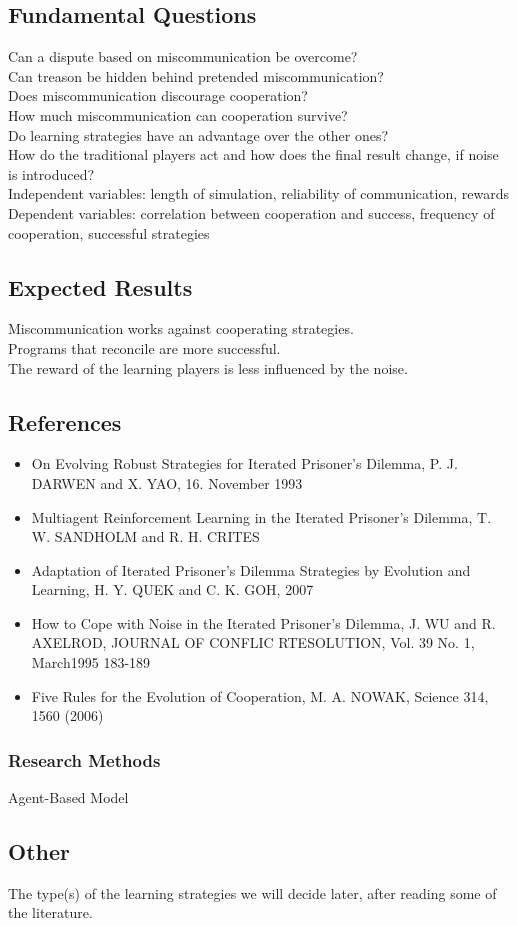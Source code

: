 \documentclass[11pt,twoside]{article}
\begin{document}
\subsection{Fundamental Questions}
Can a dispute based on miscommunication be overcome?\\
Can treason be hidden behind pretended miscommunication?\\
Does miscommunication discourage cooperation?\\
How much miscommunication can cooperation survive?\\
Do learning strategies have an advantage over the other ones?\\
How do the traditional players act and how does the final result change, 
if noise is introduced?\\
Independent variables: length of simulation, reliability of communication, rewards\\
Dependent variables: correlation between cooperation and success, frequency of cooperation, successful strategies

\subsection{Expected Results}
Miscommunication works against cooperating strategies.\\ 
Programs that reconcile are more successful.\\
The reward of the learning players is less influenced by the noise.

\subsection{References}

\begin{itemize}
\item On Evolving Robust Strategies for Iterated Prisoner's Dilemma, P. J. DARWEN and X. YAO, 16. November 1993\\
\item Multiagent Reinforcement Learning in the Iterated Prisoner's Dilemma, T. W. SANDHOLM and R. H. CRITES\\
\item Adaptation of Iterated Prisoner's Dilemma Strategies by Evolution and Learning, H. Y. QUEK and C. K. GOH, 2007\\
\item How to Cope with Noise in the Iterated Prisoner's Dilemma, J. WU and R. AXELROD, JOURNAL OF CONFLIC RTESOLUTION, Vol. 39 No. 1, March1995 183-189\\
\item Five Rules for the Evolution of Cooperation, M. A. NOWAK, Science 314, 1560 (2006)\\
\end{itemize}
\subsubsection{Research Methods}

Agent-Based Model

\subsection{Other}
The type(s) of the learning strategies we will decide later, after reading some of the literature.
\end{document}
